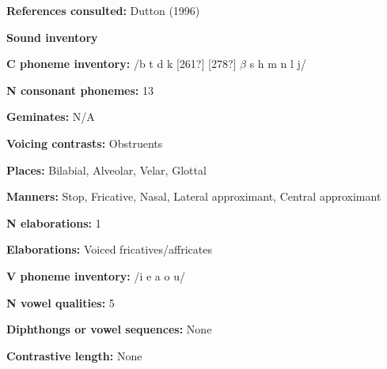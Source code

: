 \begin{styleBody}
\textbf{References consulted: }Dutton (1996)
\end{styleBody}

\begin{styleBody}
\textbf{Sound inventory}
\end{styleBody}

\begin{styleBody}
\textbf{C phoneme inventory:} /b t d k [261?] [278?] $\beta $ s h m n l j/
\end{styleBody}

\begin{styleBody}
\textbf{N consonant phonemes:} 13
\end{styleBody}

\begin{styleBody}
\textbf{Geminates:} N/A
\end{styleBody}

\begin{styleBody}
\textbf{Voicing contrasts:} Obstruents
\end{styleBody}

\begin{styleBody}
\textbf{Places:} Bilabial, Alveolar, Velar, Glottal
\end{styleBody}

\begin{styleBody}
\textbf{Manners:} Stop, Fricative, Nasal, Lateral approximant, Central approximant
\end{styleBody}

\begin{styleBody}
\textbf{N elaborations:} 1
\end{styleBody}

\begin{styleBody}
\textbf{Elaborations:} Voiced fricatives/affricates
\end{styleBody}

\begin{styleBody}
\textbf{V phoneme inventory:} /i e a o u/
\end{styleBody}

\begin{styleBody}
\textbf{N vowel qualities:} 5
\end{styleBody}

\begin{styleBody}
\textbf{Diphthongs or vowel sequences:} None
\end{styleBody}

\begin{styleBody}
\textbf{Contrastive length:} None
\end{styleBody}

